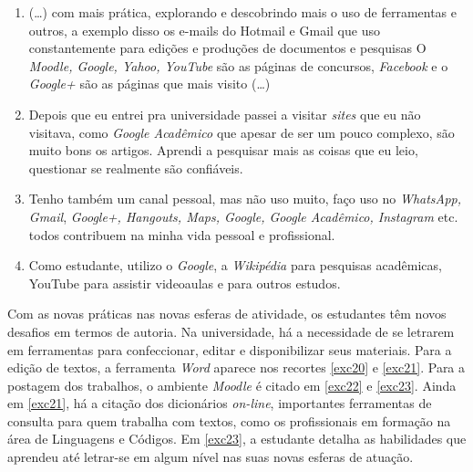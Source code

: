 \documentclass{textolivre}
\begin{document}
\begin{enumerate}[resume,label={(\arabic*)},ref={\arabic*},topsep=1ex,partopsep=1ex]
\item\label{exc16} (\ldots) com mais prática, explorando e descobrindo mais o uso de ferramentas e outros, a exemplo disso os e-mails do Hotmail e Gmail que uso constantemente para edições e produções de documentos e pesquisas O \textit{Moodle, Google, Yahoo, YouTube} são as páginas de concursos, \textit{Facebook} e o \textit{Google+} são as páginas que mais visito (\ldots)
\item\label{exc17} Depois que eu entrei pra universidade passei a visitar \textit{sites} que eu não visitava, como \textit{Google Acadêmico} que apesar de ser um pouco complexo, são muito bons os artigos. Aprendi a pesquisar mais as coisas que eu leio, questionar se realmente são confiáveis.
\item\label{exc18} Tenho também um canal pessoal, mas não uso muito, faço uso no \textit{WhatsApp, Gmail}, \textit{Google+, Hangouts, Maps, Google, Google Acadêmico, Instagram} etc. todos contribuem na minha vida pessoal e profissional.
\item\label{exc19} Como estudante, utilizo o \textit{Google}, a \textit{Wikipédia} para pesquisas acadêmicas, YouTube  para assistir videoaulas e para outros estudos.
\end{enumerate}


Com as novas práticas nas novas esferas de atividade, os estudantes têm novos desafios em termos de autoria. Na universidade, há a necessidade de se letrarem em ferramentas para confeccionar, editar e disponibilizar seus materiais. Para a edição de textos, a ferramenta \textit{Word} aparece nos recortes \ref{exc20} e \ref{exc21}. Para a postagem dos trabalhos, o ambiente \textit{Moodle} é citado em \ref{exc22} e \ref{exc23}. Ainda em \ref{exc21}, há a citação dos dicionários \textit{on-line}, importantes ferramentas de consulta para quem trabalha com textos, como os profissionais em formação na área de Linguagens e Códigos. Em \ref{exc23}, a estudante detalha as habilidades que aprendeu até letrar-se em algum nível nas suas novas esferas de atuação.
\end{document}
